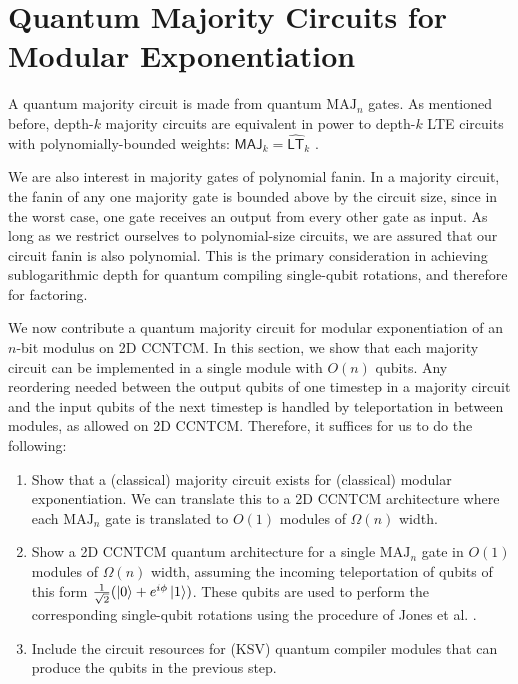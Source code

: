 \section{Quantum Majority Circuits for Modular Exponentiation}
\label{sec:fsl-majority}

A quantum majority circuit is made from quantum $\text{MAJ}_n$ gates.
As mentioned before, depth-$k$
majority circuits are equivalent in power to depth-$k$ LTE circuits
with polynomially-bounded weights: $\textsf{MAJ}_k = \hat{\textsf{LT}}_k$
\cite{Alon1994,Goldmann1994}.

We are also interest in majority gates of polynomial fanin.
In a majority circuit, the fanin of any one majority gate is
bounded above by the circuit size, since in the worst case, one
gate receives an output from every other gate as input. As long
as we restrict ourselves to polynomial-size circuits, we are
assured that our circuit fanin is also polynomial. This is the
primary consideration in achieving sublogarithmic depth for
quantum compiling single-qubit rotations, and therefore for
factoring.

We now contribute a quantum majority circuit for 
modular exponentiation
of an $n$-bit modulus on \textsf{2D CCNTCM}. In this section, we show that each majority circuit
can be implemented in a single module with $O(n)$ qubits. Any
reordering needed between the output qubits of one timestep in a majority circuit
and the input qubits of the next timestep is handled by teleportation
in between modules, as allowed on \textsf{2D CCNTCM}. Therefore, it suffices for
us to do the following:

\begin{enumerate}
\item Show that a (classical) majority circuit exists for (classical) modular exponentiation.
We can translate this to a \textsf{2D CCNTCM} architecture where each $\text{MAJ}_n$ gate
is translated to $O(1)$ modules of $\Omega(n)$ width.
\item Show a \textsf{2D CCNTCM} quantum architecture for a single $\text{MAJ}_n$ gate in
$O(1)$ modules of $\Omega(n)$ width,
assuming the incoming teleportation of qubits of this form $\frac{1}{\sqrt{2}}(\left\vert{0}\right\rangle + e^{i\phi}\left\vert{1}\right\rangle)$.
These qubits are used to perform the corresponding single-qubit rotations using the
procedure of Jones et al. \cite{Jones2012}.
\item Include the circuit resources for (KSV) quantum compiler modules that can produce
the qubits in the previous step.
\end{enumerate}

